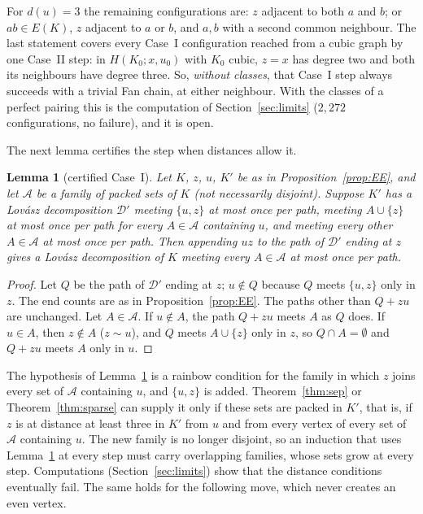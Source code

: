 \documentclass[11pt]{amsart}
\newtheorem{lemma}[theorem]{Lemma}
\theoremstyle{definition}
\newcommand{\cA}{\mathcal A}
\newcommand{\cD}{\mathcal D}
\begin{document}
For $d(u)=3$ the remaining configurations are: $z$ adjacent to both $a$ and $b$; or $ab\in E(K)$, $z$ adjacent
to $a$ or $b$, and $a,b$ with a second common neighbour. The last statement covers every Case~I configuration
reached from a cubic graph by one Case~II step: in $H(K_0;x,u_0)$ with $K_0$ cubic, $z=x$ has degree two
and both its neighbours have degree three. So, \emph{without classes}, that Case~I step always succeeds
with a trivial Fan chain, at either neighbour. With the classes of a perfect pairing this is the
computation of Section~\ref{sec:limits} ($2{,}272$ configurations, no failure), and it is open.

The next lemma certifies the step when distances allow it.

\begin{lemma}[certified Case~I]\label{lem:caseI}
Let $K$, $z$, $u$, $K'$ be as in Proposition~\ref{prop:EE}, and let $\cA$ be a family of packed sets of $K$
(not necessarily disjoint). Suppose $K'$ has a Lov\'asz decomposition $\cD'$ meeting $\{u,z\}$ at most once
per path, meeting $A\cup\{z\}$ at most once per path for every $A\in\cA$ containing $u$, and meeting every
other $A\in\cA$ at most once per path. Then appending $uz$ to the path of $\cD'$ ending at $z$ gives a
Lov\'asz decomposition of $K$ meeting every $A\in\cA$ at most once per path.
\end{lemma}

\begin{proof}
Let $Q$ be the path of $\cD'$ ending at $z$; $u\notin Q$ because $Q$ meets $\{u,z\}$ only in $z$. The end
counts are as in Proposition~\ref{prop:EE}. The paths other than $Q+zu$ are unchanged. Let $A\in\cA$. If
$u\notin A$, the path $Q+zu$ meets $A$ as $Q$ does. If $u\in A$, then $z\notin A$ ($z\sim u$), and $Q$ meets
$A\cup\{z\}$ only in $z$, so $Q\cap A=\emptyset$ and $Q+zu$ meets $A$ only in $u$.
\end{proof}

The hypothesis of Lemma~\ref{lem:caseI} is a rainbow condition for the family in which $z$ joins every set
of $\cA$ containing $u$, and $\{u,z\}$ is added. Theorem~\ref{thm:sep} or Theorem~\ref{thm:sparse} can
supply it only if these sets are packed in $K'$, that is, if $z$ is at distance at least three in $K'$ from
$u$ and from every vertex of every set of $\cA$ containing $u$. The new family is no longer disjoint, so an
induction that uses Lemma~\ref{lem:caseI} at every step must carry overlapping families, whose sets grow at
every step. Computations (Section~\ref{sec:limits}) show that the distance conditions eventually fail. The
same holds for the following move, which never creates an even vertex.
\end{document}
